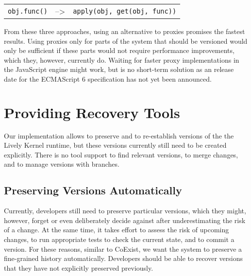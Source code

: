 \begin{center}
    \begin{tabular}{ lll }
    \lstinline|obj.func()| & --> & \lstinline|apply(obj, get(obj, func))| \\
    \end{tabular}
\end{center}

From these three approaches, using an alternative to proxies promises the fastest results.
Using proxies only for parts of the system that should be versioned would only be sufficient if these parts would not require performance improvements, which they, however, currently do.
Waiting for faster proxy implementations in the JavaScript engine might work, but is no short-term solution as an release date for the ECMAScript 6 specification has not yet been announced.


\section{Providing Recovery Tools}

Our implementation allows to preserve and to re-establish versions of the the Lively Kernel runtime, but these versions currently still need to be created explicitly.
There is no tool support to find relevant versions, to merge changes, and to manage versions with branches.


\subsection{Preserving Versions Automatically}

Currently, developers still need to preserve particular versions, which they might, however, forget or even deliberately decide against after underestimating the risk of a change.
At the same time, it takes effort to assess the risk of upcoming changes, to run appropriate tests to check the current state, and to commit a version.
For these reasons, similar to CoExist, we want the system to preserve a fine-grained history automatically.
Developers should be able to recover versions that they have not explicitly preserved previously.

